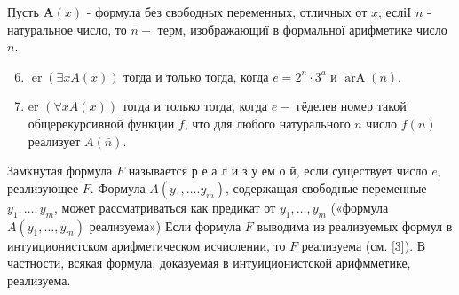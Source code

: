 \documentclass[10pt]{article}
\begin{document}
Пусть $\boldsymbol{A}(x)$ - формула без свободных переменных, отличных от $x$; есліI $n$ - натуральное число, то $\bar{n}-$ терм, изображающиї в формальної арифметике число $n$.



\begin{enumerate}

  \setcounter{enumi}{5}

  \item $\operatorname{er}(\exists x A(x))$ тогда и только тогда, когда $e=2^{n} \cdot 3^{a}$ и $\operatorname{arA}(\bar{n})$.



  \item er $(\forall x A(x))$ тогда и только тогда, когда $e-$ гёделев номер такой общерекурсивной функции $f$, что для любого натурального $n$ число $f(n)$ реализует $A(\bar{n})$.



\end{enumerate}



Замкнутая формула $F$ называется р е а л и з у ем о й, если существует число $e$, реализующее $F$. Формула $A\left(y_{1}, \ldots . y_{m}\right)$, содержащая свободные переменные $y_{1}, \ldots, y_{m}$, может рассматриваться как предикат от $y_{1}, \ldots, y_{m}$ («формула $A\left(y_{1}, \ldots, y_{m}\right)$ реализуема») Если формула $F$ выводима из реализуемых формул в интуиционистском арифметическом исчислении, то $F$ реализуема (см. [3]). В частности, всякая формула, доказуемая в интуиционистской арифмметике, реализуема.
\end{document}
